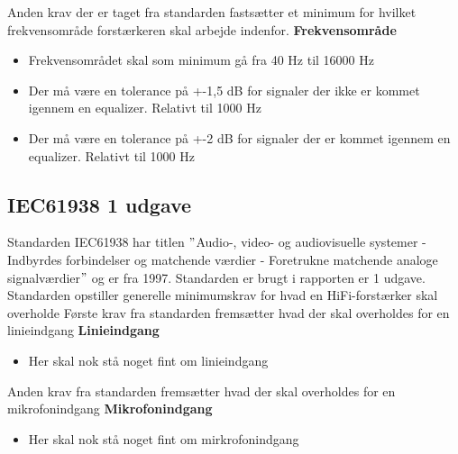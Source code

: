 Anden krav der er taget fra standarden fastsætter et minimum for hvilket frekvensområde forstærkeren skal arbejde indenfor.
\newline 
\newline
\textbf{Frekvensområde}
\begin{itemize}
\item Frekvensområdet skal som minimum gå fra 40 Hz til 16000 Hz
\item Der må være en tolerance på +-1,5 dB for signaler der ikke er kommet igennem en equalizer. Relativt til 1000 Hz
\item Der må være en tolerance på +-2 dB for signaler der er kommet igennem en equalizer. Relativt til 1000 Hz
\end{itemize}


\subsection*{IEC61938 1 udgave}
\label{IEC61938}
Standarden IEC61938 har titlen $"$Audio-, video- og audiovisuelle systemer - Indbyrdes forbindelser og matchende værdier - Foretrukne matchende analoge signalværdier$"$ og er fra 1997. Standarden er brugt i rapporten er 1 udgave. Standarden opstiller generelle minimumskrav for hvad en HiFi-forstærker skal overholde 
\newline
\newline
Første krav fra standarden fremsætter hvad der skal overholdes for en linieindgang
\newline
\newline
\textbf{Linieindgang}
\begin{itemize}
\item Her skal nok stå noget fint om linieindgang
\end{itemize}
Anden krav fra standarden fremsætter hvad der skal overholdes for en mikrofonindgang
\newline 
\newline
\textbf{Mikrofonindgang}
\begin{itemize}
\item  Her skal nok stå noget fint om mirkrofonindgang
\end{itemize}

